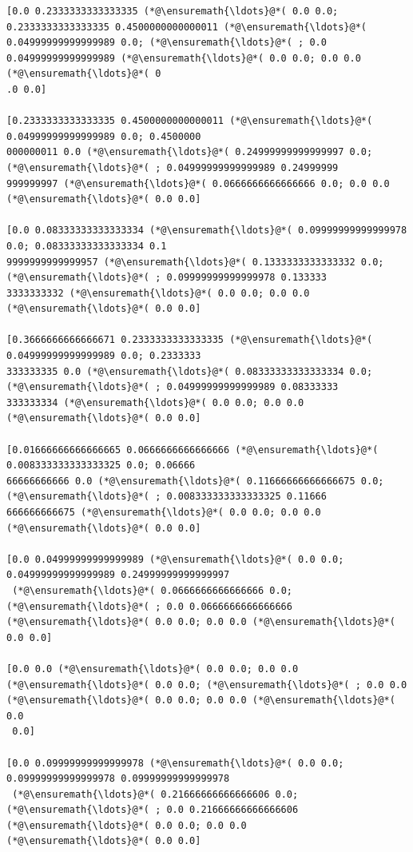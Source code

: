 \documentclass[12pt,a4paper]{article}
\begin{document}
\begin{lstlisting}
[0.0 0.2333333333333335 (*@\ensuremath{\ldots}@*( 0.0 0.0; 0.2333333333333335 0.4500000000000011 (*@\ensuremath{\ldots}@*( 
0.04999999999999989 0.0; (*@\ensuremath{\ldots}@*( ; 0.0 0.04999999999999989 (*@\ensuremath{\ldots}@*( 0.0 0.0; 0.0 0.0 (*@\ensuremath{\ldots}@*( 0
.0 0.0]

[0.2333333333333335 0.4500000000000011 (*@\ensuremath{\ldots}@*( 0.04999999999999989 0.0; 0.4500000
000000011 0.0 (*@\ensuremath{\ldots}@*( 0.24999999999999997 0.0; (*@\ensuremath{\ldots}@*( ; 0.04999999999999989 0.24999999
999999997 (*@\ensuremath{\ldots}@*( 0.0666666666666666 0.0; 0.0 0.0 (*@\ensuremath{\ldots}@*( 0.0 0.0]

[0.0 0.08333333333333334 (*@\ensuremath{\ldots}@*( 0.09999999999999978 0.0; 0.08333333333333334 0.1
9999999999999957 (*@\ensuremath{\ldots}@*( 0.1333333333333332 0.0; (*@\ensuremath{\ldots}@*( ; 0.09999999999999978 0.133333
3333333332 (*@\ensuremath{\ldots}@*( 0.0 0.0; 0.0 0.0 (*@\ensuremath{\ldots}@*( 0.0 0.0]

[0.3666666666666671 0.2333333333333335 (*@\ensuremath{\ldots}@*( 0.04999999999999989 0.0; 0.2333333
333333335 0.0 (*@\ensuremath{\ldots}@*( 0.08333333333333334 0.0; (*@\ensuremath{\ldots}@*( ; 0.04999999999999989 0.08333333
333333334 (*@\ensuremath{\ldots}@*( 0.0 0.0; 0.0 0.0 (*@\ensuremath{\ldots}@*( 0.0 0.0]

[0.01666666666666665 0.0666666666666666 (*@\ensuremath{\ldots}@*( 0.008333333333333325 0.0; 0.06666
66666666666 0.0 (*@\ensuremath{\ldots}@*( 0.11666666666666675 0.0; (*@\ensuremath{\ldots}@*( ; 0.008333333333333325 0.11666
666666666675 (*@\ensuremath{\ldots}@*( 0.0 0.0; 0.0 0.0 (*@\ensuremath{\ldots}@*( 0.0 0.0]

[0.0 0.04999999999999989 (*@\ensuremath{\ldots}@*( 0.0 0.0; 0.04999999999999989 0.24999999999999997
 (*@\ensuremath{\ldots}@*( 0.0666666666666666 0.0; (*@\ensuremath{\ldots}@*( ; 0.0 0.0666666666666666 (*@\ensuremath{\ldots}@*( 0.0 0.0; 0.0 0.0 (*@\ensuremath{\ldots}@*( 
0.0 0.0]

[0.0 0.0 (*@\ensuremath{\ldots}@*( 0.0 0.0; 0.0 0.0 (*@\ensuremath{\ldots}@*( 0.0 0.0; (*@\ensuremath{\ldots}@*( ; 0.0 0.0 (*@\ensuremath{\ldots}@*( 0.0 0.0; 0.0 0.0 (*@\ensuremath{\ldots}@*( 0.0
 0.0]

[0.0 0.09999999999999978 (*@\ensuremath{\ldots}@*( 0.0 0.0; 0.09999999999999978 0.09999999999999978
 (*@\ensuremath{\ldots}@*( 0.21666666666666606 0.0; (*@\ensuremath{\ldots}@*( ; 0.0 0.21666666666666606 (*@\ensuremath{\ldots}@*( 0.0 0.0; 0.0 0.0 
(*@\ensuremath{\ldots}@*( 0.0 0.0]


\end{lstlisting}
\end{document}
